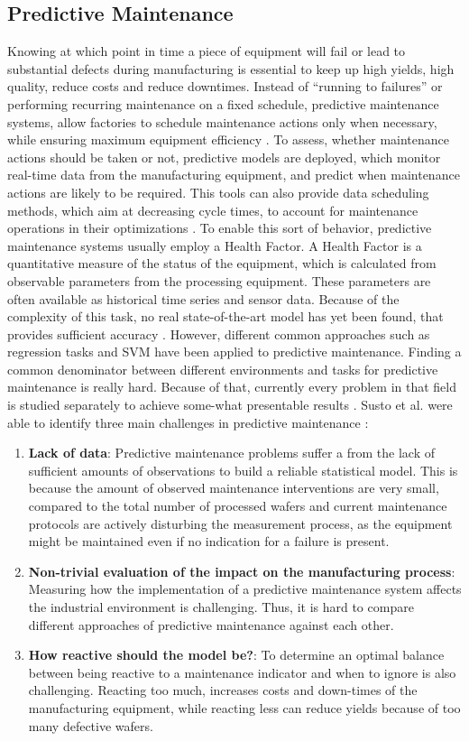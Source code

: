 \documentclass{Academic}
\begin{document}
    \subsection{Predictive Maintenance}
    Knowing at which point in time a piece of equipment will fail or lead to substantial defects during manufacturing is essential to keep up high yields, high quality, reduce costs and reduce downtimes. Instead of \enquote{running to failures} or performing recurring maintenance on a fixed schedule, predictive maintenance systems, allow factories to schedule maintenance actions only when necessary, while ensuring maximum equipment efficiency \cite{susto_automatic_2012}. To assess, whether maintenance actions should be taken or not, predictive models are deployed, which monitor real-time data from the manufacturing equipment, and predict when maintenance actions are likely to be required. This tools can also provide data scheduling methods, which aim at decreasing cycle times, to account for maintenance operations in their optimizations \cite{susto_automatic_2012}. To enable this sort of behavior, predictive maintenance systems usually employ a Health Factor. A Health Factor is a quantitative measure of the status of the equipment, which is calculated from observable parameters from the processing equipment. These parameters are often available as historical time series and sensor data. Because of the complexity of this task, no real state-of-the-art model has yet been found, that provides sufficient accuracy \cite{susto_automatic_2012}. However, different common approaches such as regression tasks and SVM have been applied to predictive maintenance. Finding a common denominator between different environments and tasks for predictive maintenance is really hard. Because of that, currently every problem in that field is studied separately to achieve some-what presentable results \cite{susto_automatic_2012}. Susto et al. were able to identify three main challenges in predictive maintenance \cite{susto_automatic_2012}:
    \begin{enumerate}
        \item \textbf{Lack of data}: Predictive maintenance problems suffer a from the lack of sufficient amounts of observations to build a reliable statistical model. This is because the amount of observed maintenance interventions are very small, compared to the total number of processed wafers and current maintenance protocols are actively disturbing the measurement process, as the equipment might be maintained even if no indication for a failure is present.
        \item \textbf{Non-trivial evaluation of the impact on the manufacturing process}: Measuring how the implementation of a predictive maintenance system affects the industrial environment is challenging. Thus, it is hard to compare different approaches of predictive maintenance against each other.
        \item \textbf{How reactive should the model be?}: To determine an optimal balance between being reactive to a maintenance indicator and when to ignore is also challenging. Reacting too much, increases costs and down-times of the manufacturing equipment, while reacting less can reduce yields because of too many defective wafers.
    \end{enumerate}
\end{document}
